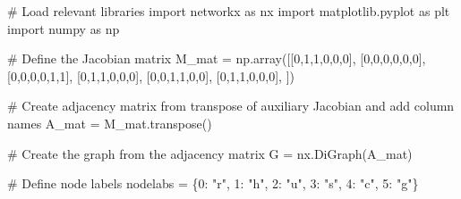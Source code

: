 \documentclass[
  letterpaper,
  DIV=11,
  numbers=noendperiod]{scrreprt}
\newenvironment{Shaded}{\begin{snugshade}}{\end{snugshade}}
\newcommand{\CommentTok}[1]{\textcolor[rgb]{0.37,0.37,0.37}{#1}}
\newcommand{\DecValTok}[1]{\textcolor[rgb]{0.68,0.00,0.00}{#1}}
\newcommand{\ImportTok}[1]{\textcolor[rgb]{0.00,0.46,0.62}{#1}}
\newcommand{\NormalTok}[1]{\textcolor[rgb]{0.00,0.23,0.31}{#1}}
\newcommand{\OperatorTok}[1]{\textcolor[rgb]{0.37,0.37,0.37}{#1}}
\newcommand{\StringTok}[1]{\textcolor[rgb]{0.13,0.47,0.30}{#1}}
\begin{document}
\begin{tcolorbox}[enhanced jigsaw, titlerule=0mm, breakable, bottomrule=.15mm, toprule=.15mm, colbacktitle=quarto-callout-note-color!10!white, rightrule=.15mm, toptitle=1mm, opacityback=0, left=2mm, coltitle=black, title=\textcolor{quarto-callout-note-color}{\faInfo}\hspace{0.5em}{Python code}, colframe=quarto-callout-note-color-frame, opacitybacktitle=0.6, leftrule=.75mm, bottomtitle=1mm, arc=.35mm, colback=white]

\begin{Shaded}
\begin{Highlighting}[]
\CommentTok{\# Load relevant libraries}
\ImportTok{import}\NormalTok{ networkx }\ImportTok{as}\NormalTok{ nx}
\ImportTok{import}\NormalTok{ matplotlib.pyplot }\ImportTok{as}\NormalTok{ plt}
\ImportTok{import}\NormalTok{ numpy }\ImportTok{as}\NormalTok{ np}

\CommentTok{\# Define the Jacobian matrix}
\NormalTok{M\_mat }\OperatorTok{=}\NormalTok{ np.array([[}\DecValTok{0}\NormalTok{,}\DecValTok{1}\NormalTok{,}\DecValTok{1}\NormalTok{,}\DecValTok{0}\NormalTok{,}\DecValTok{0}\NormalTok{,}\DecValTok{0}\NormalTok{],}
\NormalTok{                  [}\DecValTok{0}\NormalTok{,}\DecValTok{0}\NormalTok{,}\DecValTok{0}\NormalTok{,}\DecValTok{0}\NormalTok{,}\DecValTok{0}\NormalTok{,}\DecValTok{0}\NormalTok{],}
\NormalTok{                  [}\DecValTok{0}\NormalTok{,}\DecValTok{0}\NormalTok{,}\DecValTok{0}\NormalTok{,}\DecValTok{0}\NormalTok{,}\DecValTok{1}\NormalTok{,}\DecValTok{1}\NormalTok{],}
\NormalTok{                  [}\DecValTok{0}\NormalTok{,}\DecValTok{1}\NormalTok{,}\DecValTok{1}\NormalTok{,}\DecValTok{0}\NormalTok{,}\DecValTok{0}\NormalTok{,}\DecValTok{0}\NormalTok{],}
\NormalTok{                  [}\DecValTok{0}\NormalTok{,}\DecValTok{0}\NormalTok{,}\DecValTok{1}\NormalTok{,}\DecValTok{1}\NormalTok{,}\DecValTok{0}\NormalTok{,}\DecValTok{0}\NormalTok{],}
\NormalTok{                  [}\DecValTok{0}\NormalTok{,}\DecValTok{1}\NormalTok{,}\DecValTok{1}\NormalTok{,}\DecValTok{0}\NormalTok{,}\DecValTok{0}\NormalTok{,}\DecValTok{0}\NormalTok{],}
\NormalTok{                 ])}

\CommentTok{\# Create adjacency matrix from transpose of auxiliary Jacobian and add column names}
\NormalTok{A\_mat }\OperatorTok{=}\NormalTok{ M\_mat.transpose()}

\CommentTok{\# Create the graph from the adjacency matrix}
\NormalTok{G }\OperatorTok{=}\NormalTok{ nx.DiGraph(A\_mat)}

\CommentTok{\# Define node labels}
\NormalTok{nodelabs }\OperatorTok{=}\NormalTok{ \{}\DecValTok{0}\NormalTok{: }\StringTok{"r"}\NormalTok{, }\DecValTok{1}\NormalTok{: }\StringTok{"h"}\NormalTok{, }\DecValTok{2}\NormalTok{: }\StringTok{"u"}\NormalTok{, }\DecValTok{3}\NormalTok{: }\StringTok{"s"}\NormalTok{, }\DecValTok{4}\NormalTok{: }\StringTok{"c"}\NormalTok{, }\DecValTok{5}\NormalTok{: }\StringTok{"g"}\NormalTok{\}}


\end{Highlighting}
\end{Shaded}
\end{tcolorbox}
\end{document}
